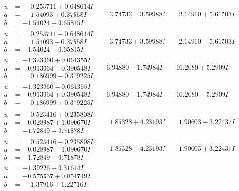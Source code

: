 \documentclass[1p]{elsarticle_modified}
\theoremstyle{definition}
\begin{document}
$$\begin{array}{c|c|c}
\begin{aligned}
u &= \phantom{-}0.253711 + 0.648614 I \\
a &= \phantom{-}1.54093 + 0.37558 I \\
b &= -1.54024 + 0.65815 I\end{aligned}
 & \phantom{-}3.74733 - 3.59988 I & \phantom{-}2.14910 + 5.61503 I \\ \hline\begin{aligned}
u &= \phantom{-}0.253711 - 0.648614 I \\
a &= \phantom{-}1.54093 - 0.37558 I \\
b &= -1.54024 - 0.65815 I\end{aligned}
 & \phantom{-}3.74733 + 3.59988 I & \phantom{-}2.14910 - 5.61503 I \\ \hline\begin{aligned}
u &= -1.323060 + 0.064355 I \\
a &= -0.913064 - 0.390548 I \\
b &= \phantom{-}0.186999 - 0.379225 I\end{aligned}
 & -6.94880 - 1.74984 I & -16.2080 + 5.2909 I \\ \hline\begin{aligned}
u &= -1.323060 - 0.064355 I \\
a &= -0.913064 + 0.390548 I \\
b &= \phantom{-}0.186999 + 0.379225 I\end{aligned}
 & -6.94880 + 1.74984 I & -16.2080 - 5.2909 I \\ \hline\begin{aligned}
u &= \phantom{-}0.523416 + 0.235808 I \\
a &= -0.028987 + 1.090670 I \\
b &= -1.72849 + 0.71878 I\end{aligned}
 & \phantom{-}1.85328 + 4.23193 I & \phantom{-}1.90603 - 3.22437 I \\ \hline\begin{aligned}
u &= \phantom{-}0.523416 - 0.235808 I \\
a &= -0.028987 - 1.090670 I \\
b &= -1.72849 - 0.71878 I\end{aligned}
 & \phantom{-}1.85328 - 4.23193 I & \phantom{-}1.90603 + 3.22437 I \\ \hline\begin{aligned}
u &= -1.39226 + 0.31614 I \\
a &= -0.575637 + 0.854749 I \\
b &= \phantom{-}1.37916 + 1.22716 I\end{aligned}

\end{array}$$
\end{document}
